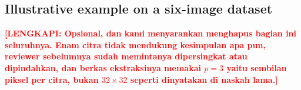 \documentclass[pdflatex,sn-basic]{sn-jnl}
\theoremstyle{thmstyleone}%
\theoremstyle{thmstyletwo}%
\theoremstyle{thmstylethree}%
\newcommand{\TODO}[1]{\textcolor{red}{\textbf{[LENGKAPI: #1]}}}
\begin{document}
\begin{appendices}

\section{Illustrative example on a six-image dataset}\label{secA1}

\TODO{Opsional, dan kami menyarankan menghapus bagian ini seluruhnya. Enam
citra tidak mendukung kesimpulan apa pun, reviewer sebelumnya sudah memintanya
dipersingkat atau dipindahkan, dan berkas ekstraksinya memakai $p=3$ yaitu
sembilan piksel per citra, bukan $32\times32$ seperti dinyatakan di naskah
lama.}

\end{appendices}


\end{document}
